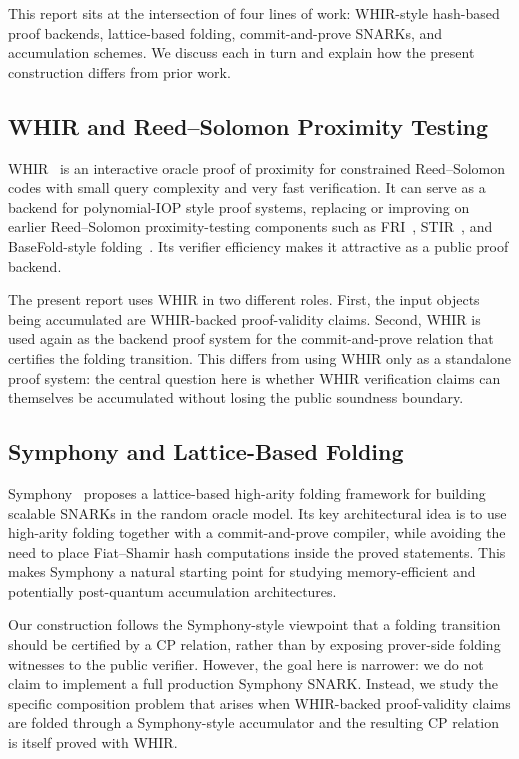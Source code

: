 \documentclass[11pt]{article}
\theoremstyle{definition}
\begin{document}
This report sits at the intersection of four lines of work: WHIR-style
hash-based proof backends, lattice-based folding, commit-and-prove SNARKs, and
accumulation schemes. We discuss each in turn and explain how the present
construction differs from prior work.

\subsection{WHIR and Reed--Solomon Proximity Testing}

WHIR~\cite{WHIR} is an interactive oracle proof of proximity for constrained
Reed--Solomon codes with small query complexity and very fast verification. It
can serve as a backend for polynomial-IOP style proof systems, replacing or
improving on earlier Reed--Solomon proximity-testing components such as
FRI~\cite{FRI}, STIR~\cite{STIR}, and BaseFold-style
folding~\cite{BaseFold}. Its verifier efficiency makes it attractive as a public
proof backend.

The present report uses WHIR in two different roles. First, the input objects
being accumulated are WHIR-backed proof-validity claims. Second, WHIR is used
again as the backend proof system for the commit-and-prove relation that
certifies the folding transition. This differs from using WHIR only as a
standalone proof system: the central question here is whether WHIR verification
claims can themselves be accumulated without losing the public soundness
boundary.

\subsection{Symphony and Lattice-Based Folding}

Symphony~\cite{Symphony} proposes a lattice-based high-arity folding framework for
building scalable SNARKs in the random oracle model. Its key architectural idea
is to use high-arity folding together with a commit-and-prove compiler, while
avoiding the need to place Fiat--Shamir hash computations inside the proved
statements. This makes Symphony a natural starting point for studying
memory-efficient and potentially post-quantum accumulation architectures.

Our construction follows the Symphony-style viewpoint that a folding transition
should be certified by a CP relation, rather than by exposing prover-side
folding witnesses to the public verifier. However, the goal here is narrower:
we do not claim to implement a full production Symphony SNARK. Instead, we study
the specific composition problem that arises when WHIR-backed proof-validity
claims are folded through a Symphony-style accumulator and the resulting CP
relation is itself proved with WHIR.
\end{document}
